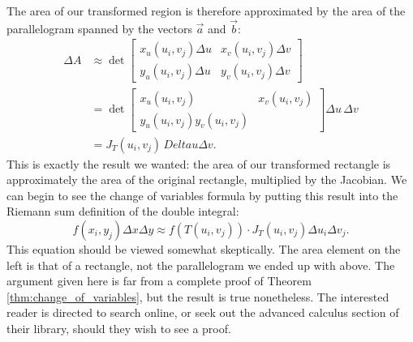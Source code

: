 The area of our transformed region is therefore approximated by the area of the parallelogram spanned by the vectors $\vec{a}$ and $\vec{b}$:
\begin{align*}
\Delta A &\approx \det\begin{bmatrix} x_u(u_i,v_j)\Delta u & x_v(u_i,v_j)\Delta v\\y_u(u_i,v_j)\Delta u & y_v(u_i,v_j)\Delta v\end{bmatrix}\\
& = \det\begin{bmatrix} x_u(u_i,v_j) & x_v(u_i,v_j)\\y_u(u_i,v_j) y_v(u_i,v_j) \end{bmatrix}\Delta u\,\Delta v\\
& = J_T(u_i,v_j)\,Delta u\Delta v.
\end{align*}
This is exactly the result we wanted: the area of our transformed rectangle is approximately the area of the original rectangle, multiplied by the Jacobian. We can begin to see the change of variables formula by putting this result into the Riemann sum definition of the double integral:
\[
f(x_i,y_j)\Delta x\Delta y \approx f(T(u_i,v_j))\cdot J_T(u_i,v_j)\Delta u_i\Delta v_j.
\]
This equation should be viewed somewhat skeptically. The area element on the left is that of a rectangle, not the parallelogram we ended up with above. The argument given here is far from a complete proof of Theorem \ref{thm:change_of_variables}, but the result is true nonetheless. The interested reader is directed to search online, or seek out the advanced calculus section of their library, should they wish to see a proof.

